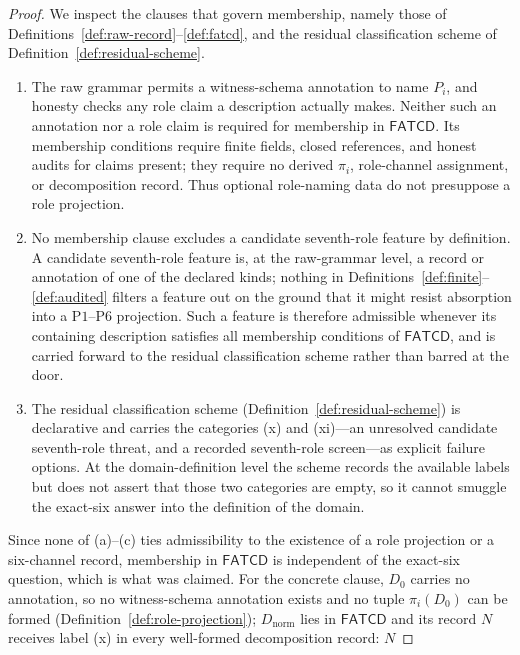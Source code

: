 \documentclass[11pt]{article}
\theoremstyle{definition}
\newcommand{\FATCD}{\ensuremath{\mathsf{FATCD}}}
\newcommand{\Pone}{\ensuremath{\mathrm{P1}}}
\newcommand{\Psix}{\ensuremath{\mathrm{P6}}}
\begin{document}
\begin{proof}
We inspect the clauses that govern membership, namely those of
Definitions~\ref{def:raw-record}--\ref{def:fatcd}, and the residual
classification scheme of Definition~\ref{def:residual-scheme}.
\begin{enumerate}[label=(\alph*),topsep=2pt,itemsep=1pt]
  \item The raw grammar permits a witness-schema annotation to name \(P_i\),
    and honesty checks any role claim a description actually makes. Neither
    such an annotation nor a role claim is required for membership in
    \FATCD{}. Its membership conditions require finite fields, closed
    references, and honest audits for claims present; they require no
    derived \(\pi_i\), role-channel assignment, or decomposition record.
    Thus optional role-naming data do not presuppose a role projection.
  \item No membership clause excludes a candidate seventh-role feature by
    definition. A candidate seventh-role feature is, at the raw-grammar
    level, a record or annotation of one of the declared kinds; nothing in
    Definitions~\ref{def:finite}--\ref{def:audited} filters a feature out on
    the ground that it might resist absorption into a
    \Pone{}--\Psix{} projection. Such a feature is therefore admissible
    whenever its containing description satisfies all membership conditions of \FATCD{}, and is carried forward to
    the residual classification scheme rather than barred at the door.
  \item The residual classification scheme
    (Definition~\ref{def:residual-scheme}) is declarative and carries the
    categories (x) and (xi)---an unresolved candidate seventh-role threat,
    and a recorded seventh-role screen---as explicit failure
    options. At the domain-definition level the scheme records the available
    labels but does not assert that those two categories are empty, so it
    cannot smuggle the exact-six answer into the definition of the domain.
\end{enumerate}
Since none of (a)--(c) ties admissibility to the existence of a role
projection or a six-channel record, membership in \FATCD{} is independent of
the exact-six question, which is what was claimed. For the concrete clause,
\(D_0\) carries no annotation, so no witness-schema annotation exists and no
tuple \(\pi_i(D_0)\) can be formed (Definition~\ref{def:role-projection}); \(D_{\mathrm{norm}}\) lies in \FATCD{}
and its record \(N\) receives label (x) in every well-formed decomposition record: \(N\)

\end{proof}
\end{document}
